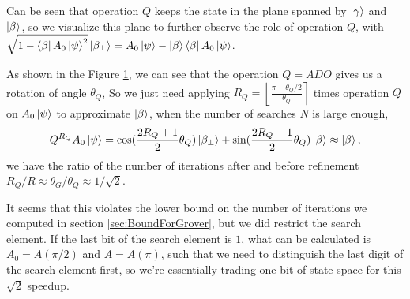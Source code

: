 \documentclass[a4paper,10pt]{book}
\numberwithin{equation}{section}
\begin{document}
Can be seen that operation $Q$ keeps the state in the plane spanned by $\ket{\gamma}$ and $\ket{\beta}$, so we visualize this plane to further observe the role of operation $Q$, with $\sqrt{1-\bra{\beta}A_{0}\ket{\psi}^{2}}\ket{\beta_{\perp}}=A_{0}\ket{\psi}-\ket{\beta}\bra{\beta}A_{0}\ket{\psi}$.
\begin{figure}[h]
    \centering
    \caption{}
    \label{fig:Abdulrahman}
\end{figure}

As shown in the Figure \ref{fig:Abdulrahman}, we can see that the operation $Q=ADO$ gives us a rotation of angle $\theta_{Q}$, So we just need applying $R_{Q}=\left\lfloor\frac{\pi-\theta_{Q}/2}{\theta_{Q}}\right\rceil$ times operation $Q$ on $A_{0}\ket{\psi}$ to approximate $\ket{\beta}$, when the number of searches $N$ is large enough,
\begin{equation}
    Q^{R_{Q}}A_{0}\ket{\psi}=\cos(\frac{2R_{Q}+1}{2}\theta_{Q})\ket{\beta_{\perp}}+\sin(\frac{2R_{Q}+1}{2}\theta_{Q})\ket{\beta}\approx\ket{\beta},
\end{equation}
we have the ratio of the number of iterations after and before refinement $R_{Q}/R\approx\theta_{G}/\theta_{Q}\approx 1/\sqrt{2}$.

It seems that this violates the lower bound on the number of iterations we computed in section \ref{sec:BoundForGrover}, but we did restrict the search element. If the last bit of the search element is $1$, what can be calculated is $A_{0}=A(\pi/2)$ and $A=A(\pi)$, such that we need to distinguish the last digit of the search element first, so we're essentially trading one bit of state space for this $\sqrt{2}$ speedup.





\end{document}
